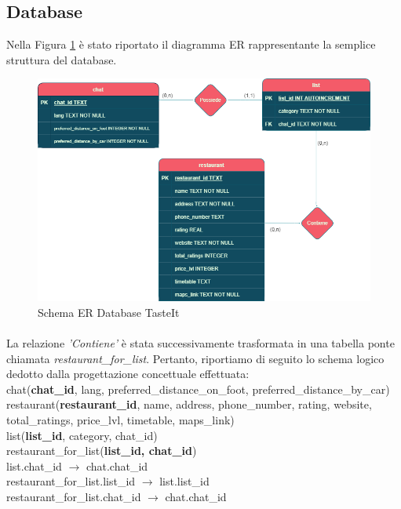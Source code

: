\documentclass[a4paper, 12pt]{article}
\begin{document}
	\subsection{Database}
	Nella Figura \ref{fig:ER_image} è stato riportato il diagramma ER rappresentante la semplice struttura del database.
	\begin{figure}[h!]
		\centering
		\includegraphics[scale=0.62]{tasteItDb.png}
		\caption{Schema ER Database TasteIt}
		\label{fig:ER_image}
	\end{figure}
	\paragraph{}
	La relazione \textit{'Contiene'} è stata successivamente trasformata in una tabella ponte chiamata \textit{restaurant\_for\_list}.
	Pertanto, riportiamo di seguito lo schema logico dedotto dalla progettazione concettuale effettuata:\\
	chat(\textbf{chat\_id}, lang, preferred\_distance\_on\_foot, preferred\_distance\_by\_car)\\
	restaurant(\textbf{restaurant\_id}, name, address, phone\_number, rating, website, total\_ratings, price\_lvl, timetable, maps\_link)\\
	list(\textbf{list\_id}, category, chat\_id)\\
	restaurant\_for\_list(\textbf{list\_id, chat\_id})\\
	list.chat\_id $\rightarrow$ chat.chat\_id\\
	restaurant\_for\_list.list\_id $\rightarrow$ list.list\_id\\
	restaurant\_for\_list.chat\_id $\rightarrow$ chat.chat\_id
	
\end{document}
